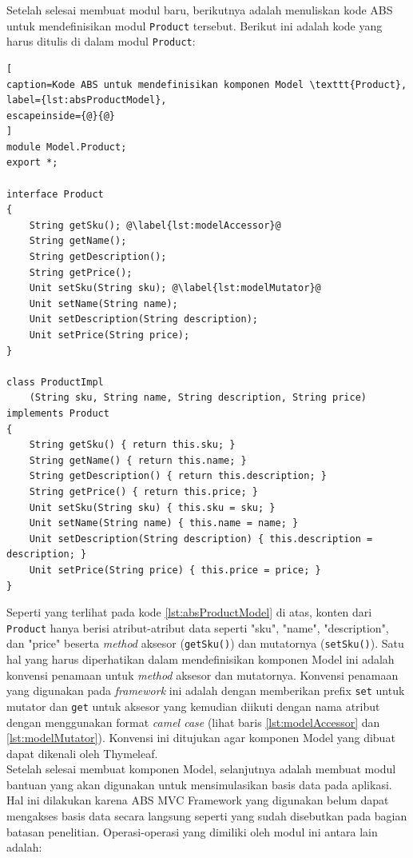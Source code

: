 Setelah selesai membuat modul baru, berikutnya adalah menuliskan kode ABS untuk mendefinisikan modul \texttt{Product} tersebut. Berikut ini adalah kode yang harus ditulis di dalam modul \texttt{Product}:

\begin{lstlisting}[
caption=Kode ABS untuk mendefinisikan komponen Model \texttt{Product},
label={lst:absProductModel},
escapeinside={@}{@}
]
module Model.Product;
export *;

interface Product
{
	String getSku(); @\label{lst:modelAccessor}@
	String getName();
	String getDescription();
	String getPrice();
	Unit setSku(String sku); @\label{lst:modelMutator}@
	Unit setName(String name);
	Unit setDescription(String description);
	Unit setPrice(String price);
}

class ProductImpl 
	(String sku, String name, String description, String price) implements Product
{
	String getSku() { return this.sku; }
	String getName() { return this.name; }
	String getDescription() { return this.description; }
	String getPrice() { return this.price; }
	Unit setSku(String sku) { this.sku = sku; }
	Unit setName(String name) { this.name = name; }
	Unit setDescription(String description) { this.description = description; }
	Unit setPrice(String price) { this.price = price; }
}
\end{lstlisting}

Seperti yang terlihat pada kode \ref{lst:absProductModel} di atas, konten dari \texttt{Product} hanya berisi atribut-atribut data seperti "sku", "name", "description", dan "price" beserta \textit{method} aksesor (\texttt{getSku()}) dan mutatornya (\texttt{setSku()}). Satu hal yang harus diperhatikan dalam mendefinisikan komponen Model ini adalah konvensi penamaan untuk \textit{method} aksesor dan mutatornya. Konvensi penamaan yang digunakan pada \textit{framework} ini adalah dengan memberikan prefix \texttt{set} untuk mutator dan \texttt{get} untuk aksesor yang kemudian diikuti dengan nama atribut dengan menggunakan format \textit{camel case} (lihat baris \ref{lst:modelAccessor} dan \ref{lst:modelMutator}). Konvensi ini ditujukan agar komponen Model yang dibuat dapat dikenali oleh Thymeleaf.\\

Setelah selesai membuat komponen Model, selanjutnya adalah membuat modul bantuan yang akan digunakan untuk mensimulasikan basis data pada aplikasi. Hal ini dilakukan karena ABS MVC Framework yang digunakan belum dapat mengakses basis data secara langsung seperti yang sudah disebutkan pada bagian batasan penelitian. Operasi-operasi yang dimiliki oleh modul ini antara lain adalah:

